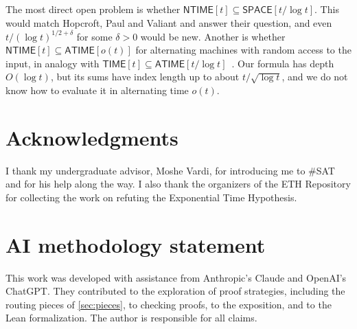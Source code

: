 \documentclass[11pt]{article}
\theoremstyle{definition}
\theoremstyle{definition}
\theoremstyle{remark}
\newcommand{\NTIME}{\mathsf{NTIME}}
\newcommand{\TIME}{\mathsf{TIME}}
\newcommand{\SPACE}{\mathsf{SPACE}}
\newcommand{\ATIME}{\mathsf{ATIME}}
\begin{document}
The most direct open problem is whether $\NTIME[t]\subseteq\SPACE[t/\log t]$. This would match Hopcroft, Paul and Valiant and answer their question, and even $t/(\log t)^{1/2+\delta}$ for some $\delta>0$ would be new. Another is whether $\NTIME[t]\subseteq\ATIME[o(t)]$ for alternating machines with random access to the input, in analogy with $\TIME[t]\subseteq\ATIME[t/\log t]$~\cite{DT85}. Our formula has depth $O(\log t)$, but its sums have index length up to about $t/\sqrt{\log t}$, and we do not know how to evaluate it in alternating time $o(t)$.

\section*{Acknowledgments}
I thank my undergraduate advisor, Moshe Vardi, for introducing me to \#SAT and for his help along the way. I also thank the organizers of the ETH Repository for collecting the work on refuting the Exponential Time Hypothesis.

\section*{AI methodology statement}\label{sec:ai}
This work was developed with assistance from Anthropic's Claude and OpenAI's ChatGPT. They contributed to the exploration of proof strategies, including the routing pieces of \cref{sec:pieces}, to checking proofs, to the exposition, and to the Lean formalization. The author is responsible for all claims.
\end{document}
